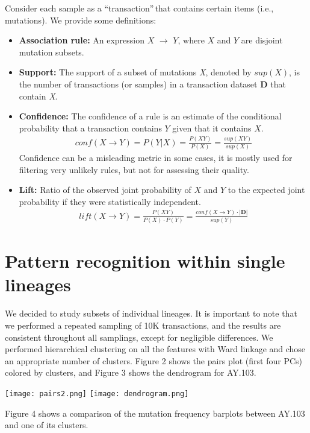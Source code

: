 \documentclass[a0,landscape]{a0poster}
\begin{document}
\begin{multicols}{4}
		Consider each sample as a \textquotedblleft transaction\textquotedblright$\,$that contains certain items (i.e., mutations). We provide some definitions:
		\begin{itemize}
			\item \textbf{Association rule:} An expression $X$ $\rightarrow$ $Y$, where $X$ and $Y$ are disjoint mutation subsets\cite{arules}. 
			\item \textbf{Support:} The support of a subset of mutations \textit{X}, denoted by $sup(X)$, is the number of transactions (or samples) in a transaction dataset \textbf{D} that contain \textit{X}. 
			\item \textbf{Confidence:} The confidence of a rule is an estimate of the conditional probability that a transaction contains $Y$ given that it contains $X$.
			\begin{align*}
				conf(X \rightarrow Y) = P(Y|X) = \frac{P(XY)}{P(X)} = \frac{sup(XY)}{sup(X)}
			\end{align*}
			Confidence can be a misleading metric in some cases, it is mostly used for filtering very unlikely rules, but not for assessing their quality.
			\item \textbf{Lift:} Ratio of the observed joint probability of $X$ and $Y$ to the expected joint probability if they were statistically independent.	
			\begin{align*}
				lift(X \rightarrow Y) = \frac{P(XY)}{P(X)\cdot P(Y)} = \frac{conf(X\rightarrow Y)\cdot |\mathbf{D}|}{sup(Y)}
			\end{align*}
		\end{itemize}
		
		\section*{Pattern recognition within single lineages}
		We decided to study subsets of individual lineages. It is important to note that we performed a repeated sampling of 10K transactions, and the results are consistent throughout all samplings, except for negligible differences. We performed hierarchical clustering on all the features with Ward linkage and chose an appropriate number of clusters. Figure 2 shows the pairs plot (first four PCs) colored by clusters, and Figure 3 shows the dendrogram for AY.103. 
		\begin{center}\vspace{1cm}
			\texttt{[image: pairs2.png]}
			\texttt{[image: dendrogram.png]}
		\end{center}\vspace{1cm}
		Figure 4 shows a comparison of the mutation frequency barplots between AY.103 and one of its clusters. 


\end{multicols}
\end{document}
